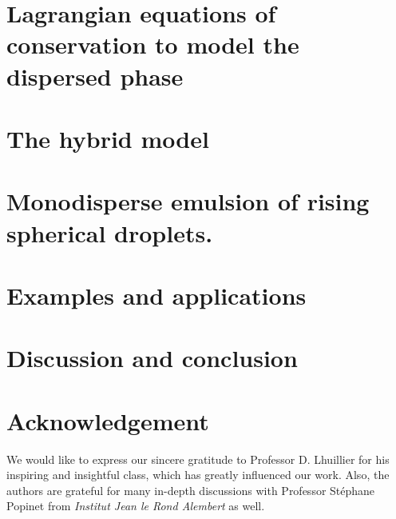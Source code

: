 \documentclass[12pt]{My_preprint}
\begin{document}
\section{Lagrangian equations of conservation to model the dispersed phase}
\label{sec:Lagrangian}


\section{The hybrid model}
\label{sec:averaged_eq}






\section{Monodisperse emulsion of rising spherical droplets.}
\label{sec:Exemples}
 



% 
% 
\section{Examples and applications}

% 
% 



\section{Discussion and conclusion}


\section*{Acknowledgement}
We would like to express our sincere gratitude to Professor D. Lhuillier for his inspiring and insightful class, which has greatly influenced our work.
Also, the authors are grateful for many in-depth discussions with Professor St\'ephane Popinet from \textit{Institut Jean le Rond Alembert} as well. 




\appendix





\end{document}
